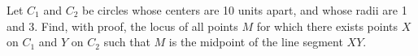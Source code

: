Let $C_1$ and $C_2$ be circles whose centers are 10 units apart, and
whose radii are 1 and 3. Find, with proof, the locus of all points $M$
for which there exists points $X$ on $C_1$ and $Y$ on $C_2$ such that
$M$ is the midpoint of the line segment $XY$.
